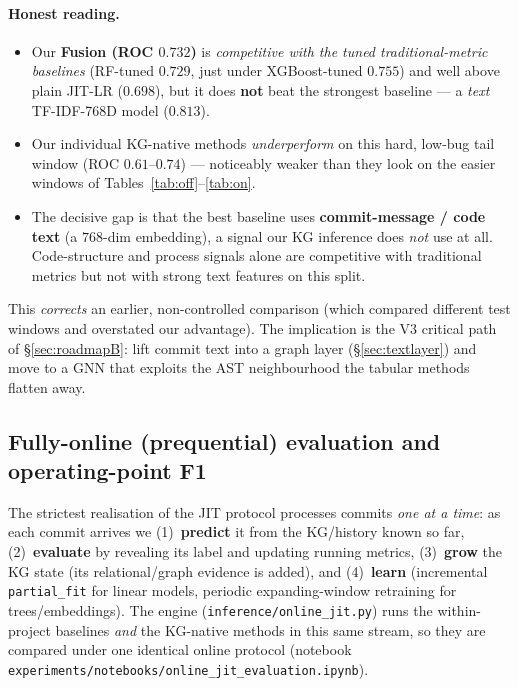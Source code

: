 \documentclass[11pt,a4paper]{article}
\newcommand{\code}[1]{\texttt{#1}}
\begin{document}
	\paragraph{Honest reading.}
	\begin{itemize}[nosep]
		\item Our \textbf{Fusion (ROC $0.732$)} is \emph{competitive with the tuned
			traditional-metric baselines} (RF-tuned $0.729$, just under
		XGBoost-tuned $0.755$) and well above plain JIT-LR ($0.698$), but it does
		\textbf{not} beat the strongest baseline --- a \emph{text} TF-IDF-768D
		model ($0.813$).
		\item Our individual KG-native methods \emph{underperform} on this hard,
		low-bug tail window (ROC $0.61$--$0.74$) --- noticeably weaker than they
		look on the easier windows of Tables~\ref{tab:off}--\ref{tab:on}.
		\item The decisive gap is that the best baseline uses \textbf{commit-message /
			code text} (a $768$-dim embedding), a signal our KG inference does
		\emph{not} use at all. Code-structure and process signals alone are
		competitive with traditional metrics but not with strong text features on
		this split.
	\end{itemize}
	This \emph{corrects} an earlier, non-controlled comparison (which compared
	different test windows and overstated our advantage). The implication is the
	V3 critical path of \S\ref{sec:roadmapB}: lift commit text into a graph layer
	(\S\ref{sec:textlayer}) and move to a GNN that exploits the AST neighbourhood the
	tabular methods flatten away.
	
	\subsection{Fully-online (prequential) evaluation and operating-point F1}\label{sec:onlinejit}
	The strictest realisation of the JIT protocol processes commits \emph{one at a
		time}: as each commit arrives we (1)~\textbf{predict} it from the KG/history
	known so far, (2)~\textbf{evaluate} by revealing its label and updating running
	metrics, (3)~\textbf{grow} the KG state (its relational/graph evidence is added),
	and (4)~\textbf{learn} (incremental \code{partial\_fit} for linear models,
	periodic expanding-window retraining for trees/embeddings). The engine
	(\texttt{inference/online\_jit.py}) runs the within-project baselines \emph{and}
	the KG-native methods in this same stream, so they are compared under one
	identical online protocol (notebook
	\texttt{experiments/notebooks/online\_jit\_evaluation.ipynb}).
	
\end{document}
